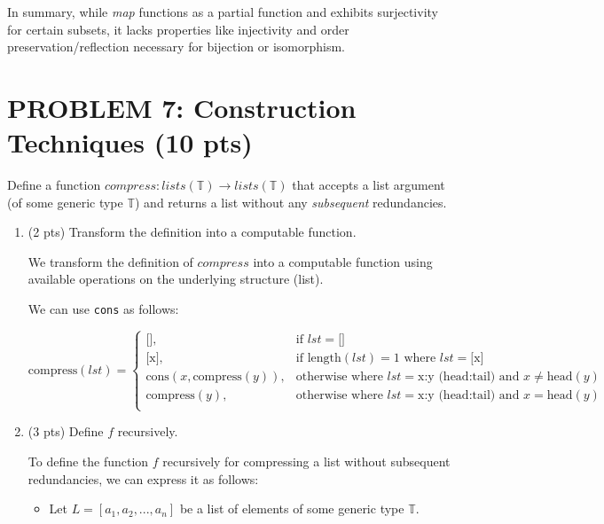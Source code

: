 \documentclass[12pt]{article}
\begin{document}
\begin{spacing}{1.5}
	\noindent In summary, while \textit{map} functions as a partial function and exhibits surjectivity for certain subsets, it lacks properties like injectivity and order preservation/reflection necessary for bijection or isomorphism.
			    
	\newpage
	\section*{PROBLEM 7: Construction Techniques (10 pts)}
		
	Define a function $compress : lists(\mathbb{T}) \rightarrow lists(\mathbb{T})$ that accepts a list argument (of some generic type $\mathbb{T}$) and returns a list without any \textit{subsequent} redundancies.
		
	\begin{enumerate}
		\item (2 pts) Transform the definition into a computable function.
		      		      
		      We transform the definition of $compress$ into a computable function using available operations on the underlying structure (list).
		      
		      We can use \texttt{cons} as follows:
		      
		      $$\text{compress}(lst) =\begin{cases}\text{[]}, & \text{if } lst = \text{[]} \\\text{[x]}, & \text{if } \text{length}(lst) = 1 \text{ where } lst = \text{[x]} \\\text{cons}(x, \text{compress}(y)), & \text{otherwise where } lst = \text{x:y} \text{ (head:tail) and } x \neq \text{head}(y) \\\text{compress}(y), & \text{otherwise where } lst = \text{x:y} \text{ (head:tail) and } x = \text{head}(y) \\\end{cases}$$
		      		
		\item (3 pts) Define $f$ recursively.
		      		      
		      To define the function $f$ recursively for compressing a list without subsequent redundancies, we can express it as follows: 
		      		      
		      \begin{itemize}
		      	\item Let $L = [a_1, a_2, ..., a_n]$ be a list of elements of some generic type $\mathbb{T}$.
		      	      		      	      

\end{itemize}
\end{enumerate}
\end{spacing}
\end{document}
